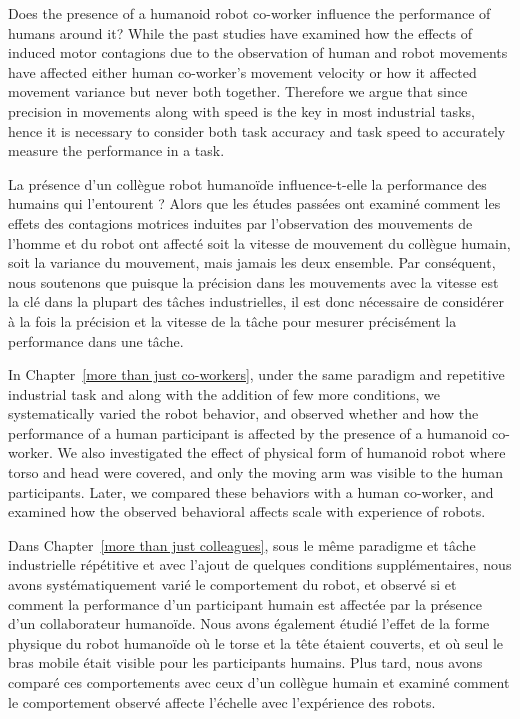Does the presence of a humanoid robot co-worker influence the performance of humans around it? While the past studies have examined how the effects of induced motor contagions due to the observation of human and robot movements have affected either human co-worker's movement velocity or how it affected movement variance but never both together. Therefore we argue that since precision in movements along with speed is the key in most industrial tasks, hence it is necessary to consider both task accuracy and task speed to accurately measure the performance in a task.

La présence d'un collègue robot humanoïde influence-t-elle la performance des humains qui l'entourent ? Alors que les études passées ont examiné comment les effets des contagions motrices induites par l'observation des mouvements de l'homme et du robot ont affecté soit la vitesse de mouvement du collègue humain, soit la variance du mouvement, mais jamais les deux ensemble. Par conséquent, nous soutenons que puisque la précision dans les mouvements avec la vitesse est la clé dans la plupart des tâches industrielles, il est donc nécessaire de considérer à la fois la précision et la vitesse de la tâche pour mesurer précisément la performance dans une tâche.




In Chapter~\ref{more than just co-workers}, under the same paradigm and repetitive industrial task and along with the addition of few more conditions, we systematically varied the robot behavior, and observed whether and how the performance of a human participant is affected by the presence of a humanoid co-worker. We also investigated the effect of physical form of humanoid robot where torso and head were covered, and only the moving arm was visible to the human participants. Later, we compared these behaviors with a human co-worker, and examined how the observed behavioral affects scale with experience of robots. 

Dans Chapter~\ref{more than just colleagues}, sous le même paradigme et tâche industrielle répétitive et avec l'ajout de quelques conditions supplémentaires, nous avons systématiquement varié le comportement du robot, et observé si et comment la performance d'un participant humain est affectée par la présence d'un collaborateur humanoïde. Nous avons également étudié l'effet de la forme physique du robot humanoïde où le torse et la tête étaient couverts, et où seul le bras mobile était visible pour les participants humains. Plus tard, nous avons comparé ces comportements avec ceux d'un collègue humain et examiné comment le comportement observé affecte l'échelle avec l'expérience des robots. 





